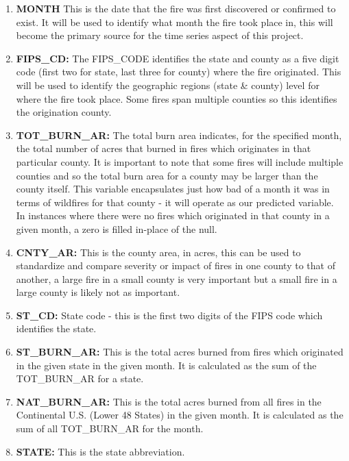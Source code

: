 \documentclass[12pt]{article}
\begin{document}
\begin{enumerate} \item \textbf{MONTH} This is the date that the fire was first discovered or confirmed to exist. It will be used to identify what month the fire took place in, this will become the primary source for the time series aspect of this project.

\item \textbf{FIPS\_CD:} The FIPS\_CODE identifies the state and county as a five digit code (first two for state, last three for county) where the fire originated. This will be used to identify the geographic regions (state \& county) level for where the fire took place. Some fires span multiple counties so this identifies the origination county. 

\item \textbf{TOT\_BURN\_AR:} The total burn area indicates, for the specified month, the total number of acres that burned in fires which originates in that particular county. It is important to note that some fires will include multiple counties and so the total burn area for a county may be larger than the county itself. This variable encapsulates just how bad of a month it was in terms of wildfires for that county - it will operate as our predicted variable. In instances where there were no fires which originated in that county in a given month, a zero is filled in-place of the null. 

\item \textbf{CNTY\_AR:} This is the county area, in acres, this can be used to standardize and compare severity or impact of fires in one county to that of another, a large fire in a small county is very important but a small fire in a large county is likely not as important. 

\item \textbf{ST\_CD:} State code - this is the first two digits of the FIPS code which identifies the state. 

\item \textbf{ST\_BURN\_AR:} This is the total acres burned from fires which originated in the given state in the given month. It is calculated as the sum of the TOT\_BURN\_AR for a state. 

\item \textbf{NAT\_BURN\_AR:} This is the total acres burned from all fires in the Continental U.S. (Lower 48 States) in the given month. It is calculated as the sum of all TOT\_BURN\_AR for the month. 

\item \textbf{STATE:} This is the state abbreviation. 


\end{enumerate}
\end{document}
